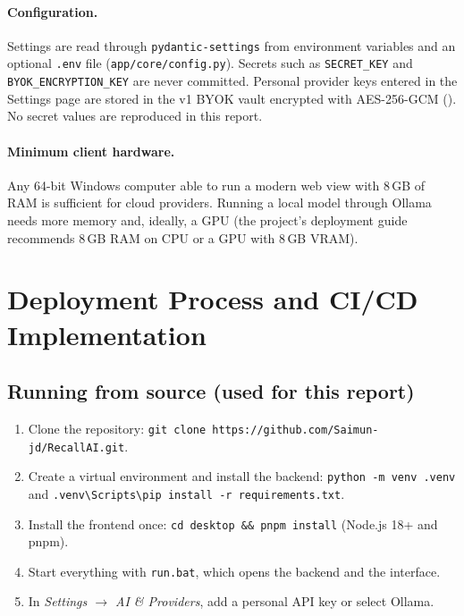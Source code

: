 \paragraph{Configuration.} Settings are read through \texttt{pydantic-settings} from environment
variables and an optional \texttt{.env} file (\texttt{app/core/config.py}). Secrets such as
\texttt{SECRET\_KEY} and \texttt{BYOK\_ENCRYPTION\_KEY} are never committed. Personal provider
keys entered in the Settings page are stored in the v1 BYOK vault encrypted with AES-256-GCM
(). No secret values are reproduced in this report.

\paragraph{Minimum client hardware.} Any 64-bit Windows computer able to run a modern web view
with 8\,GB of RAM is sufficient for cloud providers. Running a local model through Ollama needs
more memory and, ideally, a GPU (the project's deployment guide recommends 8\,GB RAM on CPU or a
GPU with 8\,GB VRAM).

\section{Deployment Process and CI/CD Implementation}\label{sec:deploy-process}

\subsection{Running from source (used for this report)}
\begin{enumerate}
  \item Clone the repository: \texttt{git clone https://github.com/Saimun-jd/RecallAI.git}.
  \item Create a virtual environment and install the backend:
        \texttt{python -m venv .venv} and \texttt{.venv\textbackslash Scripts\textbackslash pip install -r requirements.txt}.
  \item Install the frontend once: \texttt{cd desktop \&\& pnpm install} (Node.js 18+ and pnpm).
  \item Start everything with \texttt{run.bat}, which opens the backend and the interface.
  \item In \emph{Settings $\rightarrow$ AI \& Providers}, add a personal API key or select Ollama.
\end{enumerate}

